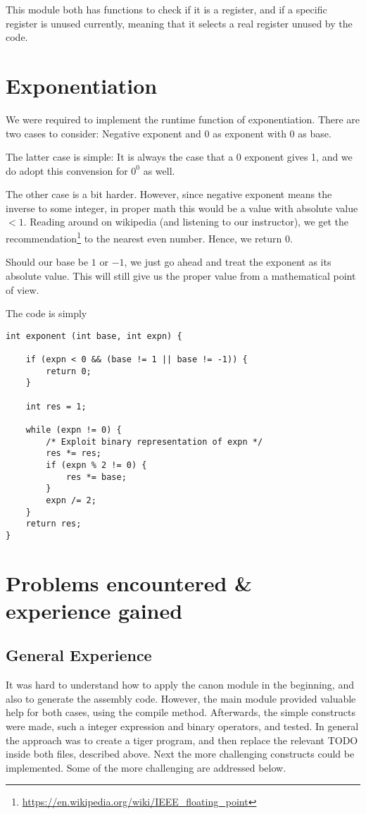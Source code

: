 \documentclass{article}
\begin{document}
This module both has functions to check if it is a register, and if a specific register is unused currently, meaning that it selects a real register unused by the code.

\section{Exponentiation}
We were required to implement the runtime function of exponentiation. There are two cases to consider: Negative exponent and 0 as exponent with 0 as base.

The latter case is simple: It is always the case that a 0 exponent gives 1, and we do adopt this convension for $0^0$ as well.

The other case is a bit harder. However, since negative exponent means the inverse to some integer, in proper math this would be a value with absolute value $ < 1$. Reading around on wikipedia (and listening to our instructor), we get the recommendation\footnote{\url{https://en.wikipedia.org/wiki/IEEE_floating_point}} to the nearest even number. Hence, we return 0.

Should our base be $1$ or $-1$, we just go ahead and treat the exponent as its absolute value. This will still give us the proper value from a mathematical point of view.

The code is simply
\begin{verbatim}
int exponent (int base, int expn) {

    if (expn < 0 && (base != 1 || base != -1)) {
        return 0;
    }

    int res = 1;

    while (expn != 0) {
        /* Exploit binary representation of expn */
        res *= res;
        if (expn % 2 != 0) {
            res *= base;
        }
        expn /= 2;
    }
    return res;
}
\end{verbatim}
\section{Problems encountered \& experience gained}

\subsection{General Experience}
It was hard to understand how to apply the canon module in the beginning, and also to generate the assembly code. However, the main module provided valuable help for both cases, using the compile method. Afterwards, the simple constructs were made, such a integer expression and binary operators, and tested. In general the approach was to create a tiger program, and then replace the relevant TODO inside both files, described above.
Next the more challenging constructs could be implemented. Some of the more challenging are addressed below.  
\end{document}
